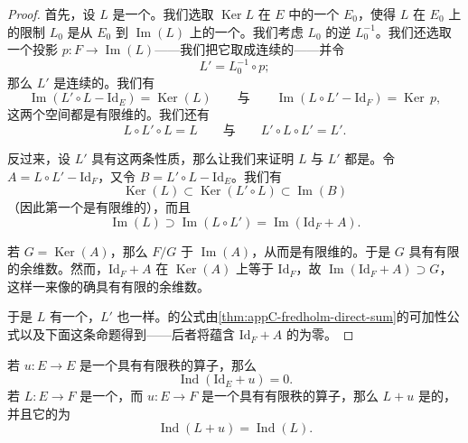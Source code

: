 \begin{proof}
首先，设 $L$ 是一个\trFredholmOperator。我们选取 $\operatorname{Ker} L$ 在 $E$ 中的一个\trComplement{} $E_0$，使得 $L$ 在 $E_0$ 上的限制 $L_0$ 是从 $E_0$ 到 $\operatorname{Im}(L)$ 上的一个\trIsomorphism。我们考虑 $L_0$ 的逆 $L_0^{-1}$。我们还选取一个投影 $p : F \to \operatorname{Im}(L)$——我们把它取成连续的——并令
\[
L' = L_0^{-1} \circ p;
\]
那么 $L'$ 是连续的。我们有
\[
\operatorname{Im}(L' \circ L - \mathrm{Id}_E) = \operatorname{Ker}(L) \qquad\text{与}\qquad \operatorname{Im}(L \circ L' - \mathrm{Id}_F) = \operatorname{Ker}\, p,
\]
这两个空间都是有限维的。我们还有
\[
L \circ L' \circ L = L \qquad\text{与}\qquad L' \circ L \circ L' = L'.
\]

反过来，设 $L'$ 具有这两条性质，那么让我们来证明 $L$ 与 $L'$ 都是\trFredholmOperator。令 $A = L \circ L' - \mathrm{Id}_F$，又令 $B = L' \circ L - \mathrm{Id}_E$。我们有
\[
\operatorname{Ker}(L) \subset \operatorname{Ker}(L' \circ L) \subset \operatorname{Im}(B)
\]
（因此第一个\trKernel{}是有限维的），而且
\[
\operatorname{Im}(L) \supset \operatorname{Im}(L \circ L') = \operatorname{Im}(\mathrm{Id}_F + A).
\]

若 $G = \operatorname{Ker}(A)$，那么 $F/G$ \trIsomorphic{}于 $\operatorname{Im}(A)$，从而是有限维的。于是 $G$ 具有有限的余维数。然而，$\mathrm{Id}_F + A$ 在 $\operatorname{Ker}(A)$ 上等于 $\mathrm{Id}_F$，故 $\operatorname{Im}(\mathrm{Id}_F + A) \supset G$，这样一来像的确具有有限的余维数。

于是 $L$ 有一个\trIndex，$L'$ 也一样。\trIndex{}的公式由\cref{thm:appC-fredholm-direct-sum}的可加性公式以及下面这条命题得到——后者将蕴含 $\mathrm{Id}_F + A$ 的\trIndex{}为零。
\end{proof}

\begin{proposition}\label{thm:appC-fredholm-finite-rank-perturbation}
若 $u : E \to E$ 是一个具有有限秩的算子，那么
\[
\operatorname{Ind}(\mathrm{Id}_E + u) = 0.
\]
若 $L : E \to F$ 是一个\trFredholmOperator，而 $u : E \to F$ 是一个具有有限秩的算子，那么 $L + u$ 是\trFredholm{}的，并且它的\trIndex{}为
\[
\operatorname{Ind}(L + u) = \operatorname{Ind}(L).
\]
\end{proposition}

